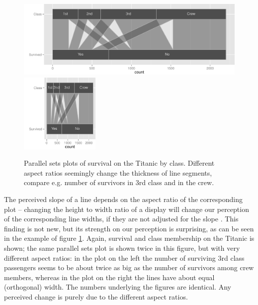 \documentclass[journal]{vgtc}\usepackage{graphicx, color}
\begin{document}
\begin{figure}[htbp]
\begin{center}
\includegraphics[height=1.5in]{images/aspect31-titanic.pdf}
\includegraphics[height=1.5in]{images/aspect33-titanic.pdf}
\end{center}
\caption{\label{fig:aspect}Parallel sets plots of survival on the Titanic by class. Different aspect ratios  seemingly change the thickness of line segments, compare e.g. number of survivors in 3rd class and in the crew. }
\end{figure}



The perceived slope of a line depends on the aspect ratio of the corresponding plot -- changing the height to width ratio of a display  will change our perception of the corresponding line widths, if they are not adjusted for the slope \citep{cleveland:1984}. This finding is not new, but its strength on our perception is surprising, as can be seen in the example of  figure \ref{fig:aspect}.  Again, survival and class membership on the Titanic is shown; the same parallel sets plot is shown twice in this figure, but with very different aspect ratios: in the  plot on the left the number of surviving 3rd class passengers seems to be about twice as big as the number of survivors among crew members, whereas in the plot on the right the lines have about equal (orthogonal) width. The numbers underlying the figures are identical. Any perceived change is purely due to the different  aspect ratios. 
\end{document}
